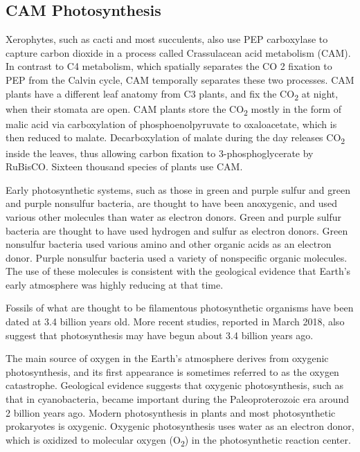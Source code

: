 \hypertarget{cam-photosynthesis}{%
\subsection{CAM Photosynthesis}\label{cam-photosynthesis}}

Xerophytes, such as cacti and most succulents, also use PEP carboxylase to capture carbon dioxide in a process called Crassulacean acid metabolism (CAM). In contrast to C4 metabolism, which spatially separates the CO
2 fixation to PEP from the Calvin cycle, CAM temporally separates these two processes. CAM plants have a different leaf anatomy from C3 plants, and fix the CO\textsubscript{2} at night, when their stomata are open. CAM plants store the CO\textsubscript{2} mostly in the form of malic acid via carboxylation of phosphoenolpyruvate to oxaloacetate, which is then reduced to malate. Decarboxylation of malate during the day releases CO\textsubscript{2} inside the leaves, thus allowing carbon fixation to 3-phosphoglycerate by RuBisCO. Sixteen thousand species of plants use CAM.

Early photosynthetic systems, such as those in green and purple sulfur and green and purple nonsulfur bacteria, are thought to have been anoxygenic, and used various other molecules than water as electron donors. Green and purple sulfur bacteria are thought to have used hydrogen and sulfur as electron donors. Green nonsulfur bacteria used various amino and other organic acids as an electron donor. Purple nonsulfur bacteria used a variety of nonspecific organic molecules. The use of these molecules is consistent with the geological evidence that Earth's early atmosphere was highly reducing at that time.

Fossils of what are thought to be filamentous photosynthetic organisms have been dated at 3.4 billion years old. More recent studies, reported in March 2018, also suggest that photosynthesis may have begun about 3.4 billion years ago.

The main source of oxygen in the Earth's atmosphere derives from oxygenic photosynthesis, and its first appearance is sometimes referred to as the oxygen catastrophe. Geological evidence suggests that oxygenic photosynthesis, such as that in cyanobacteria, became important during the Paleoproterozoic era around 2 billion years ago. Modern photosynthesis in plants and most photosynthetic prokaryotes is oxygenic. Oxygenic photosynthesis uses water as an electron donor, which is oxidized to molecular oxygen (O\textsubscript{2}) in the photosynthetic reaction center.

